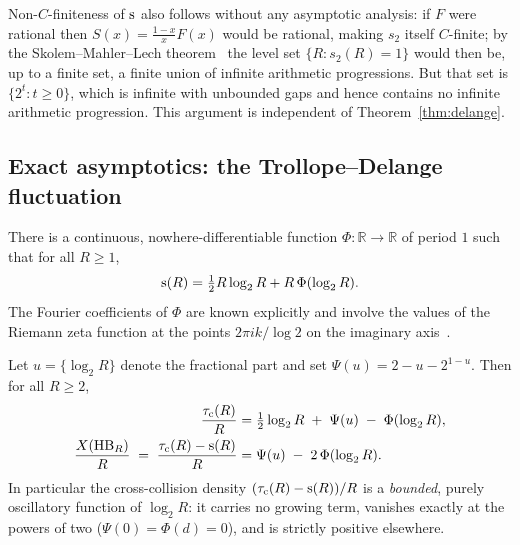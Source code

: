 \begin{remark}\label{rem:sml}
	Non-$C$-finiteness of $\mathrm{s}$ also follows without any asymptotic
	analysis: if $F$ were rational then $S(x) = \frac{1-x}{x} F(x)$ would be
	rational, making $s_2$ itself $C$-finite; by the Skolem--Mahler--Lech
	theorem~\cite{everest2003recurrence} the level set
	$\{R : s_2(R) = 1\}$ would then be, up to a finite set, a finite union
	of infinite arithmetic progressions. But that set is
	$\{2^t : t \ge 0\}$, which is infinite with unbounded gaps and hence
	contains no infinite arithmetic progression. This argument is
	independent of Theorem~\ref{thm:delange}.
\end{remark}

\subsection{Exact asymptotics: the Trollope--Delange fluctuation}

\begin{theorem}\label{thm:delange}
	There is a continuous, nowhere-differentiable function
	$\Phi \colon \mathbb{R} \to \mathbb{R}$ of period $1$ such that for all
	$R \ge 1$,
	\begin{equation}\label{eq:delange}
		\mathrm{s}(R) = \tfrac{1}{2} R \log_2 R + R\,\Phi(\log_2 R).
	\end{equation}
	The Fourier coefficients of $\Phi$ are known explicitly and involve the
	values of the Riemann zeta function at the points
	$2\pi i k/\log 2$ on the imaginary axis~\cite{delange1975somme}.
\end{theorem}

\begin{corollary}\label{cor:densities}
	Let $u = \{\log_2 R\}$ denote the fractional part and set
	$\Psi(u) = 2 - u - 2^{1-u}$. Then for all $R \ge 2$,
	\begin{align}
		\frac{\tau_{\mathrm{c}}(R)}{R}
		 & = \tfrac{1}{2}\log_2 R \;+\; \Psi(u) \;-\; \Phi(\log_2 R),
		\label{eq:C-density}                                        \\
		\frac{X(\mathrm{HB}_R)}{R} \;=\; \frac{\tau_{\mathrm{c}}(R)-\mathrm{s}(R)}{R}
		 & = \Psi(u) \;-\; 2\,\Phi(\log_2 R).
		\label{eq:X-density}
	\end{align}
	In particular the cross-collision density
	$(\tau_{\mathrm{c}}(R)-\mathrm{s}(R))/R$ is a \emph{bounded}, purely oscillatory function
	of $\log_2 R$: it carries no growing term, vanishes exactly at the powers
	of two ($\Psi(0) = \Phi(d) = 0$), and is strictly positive elsewhere.
\end{corollary}

